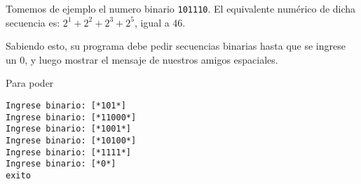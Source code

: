 \documentclass[spanish]{scrartcl}
\begin{document}
Tomemos de ejemplo el numero binario \texttt{101110}. El equivalente numérico de dicha secuencia es: $2^{1} + 2^{2} + 2^{3} + 2^{5}$, igual a 46.

Sabiendo esto, su programa debe pedir secuencias binarias hasta que se ingrese un 0, y luego mostrar el mensaje de nuestros amigos espaciales.

Para poder 

\begin{lstlisting}[style=consola]
Ingrese binario: [*101*]
Ingrese binario: [*11000*]
Ingrese binario: [*1001*]
Ingrese binario: [*10100*]
Ingrese binario: [*1111*]
Ingrese binario: [*0*]
exito
\end{lstlisting}
\end{document}
